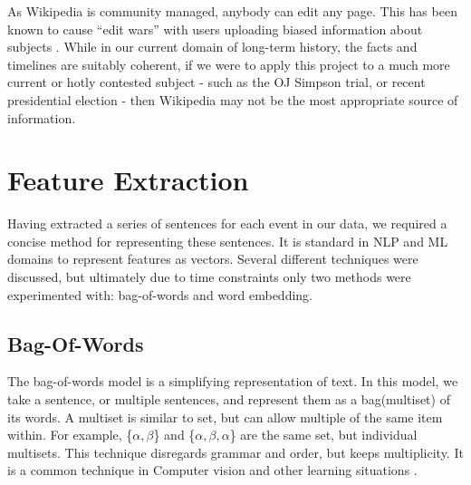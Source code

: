 \documentclass[bsc,frontabs,twoside,singlespacing,parskip,deptreport]{infthesis}     %
\begin{document}
As Wikipedia is community managed, anybody can edit any page. This has been known to cause ``edit wars'' with users
uploading biased information about subjects \cite{}.
While in our current domain of long-term history, the facts and timelines are suitably coherent, if we were to apply this project
to a much more current or hotly contested subject - such as the OJ Simpson trial, or recent presidential election - then Wikipedia
may not be the most appropriate source of information.


\section{Feature Extraction}\label{sec:representation}
Having extracted a series of sentences for each event in our data, we required a concise method
for representing these sentences. It is standard in NLP and ML domains to represent features as vectors.
Several different techniques were discussed, but ultimately due to time constraints only two methods were
experimented with: bag-of-words and word embedding.
\subsection{Bag-Of-Words}
The bag-of-words model is a simplifying representation of text.
In this model, we take a sentence, or multiple sentences, and represent them as a bag(multiset) of its words.
A multiset is similar to set, but can allow multiple of the same item within.
For example, \{$\alpha,\beta$\} and \{$\alpha,\beta,\alpha$\} are the same set, but individual multisets.
This technique disregards grammar and order, but keeps multiplicity. It is a common technique in Computer vision
and other learning situations \cite{sivic2009efficient}.
\end{document}
